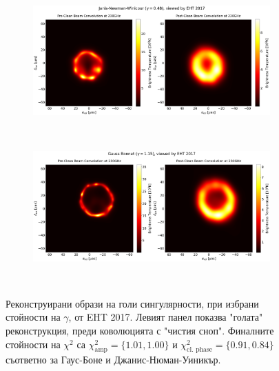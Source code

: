 \begin{figure}[h!]
	\centering
	\begin{subfigure}{12cm}
		\hspace{-1.5cm}
		\includegraphics[scale = 0.23]{Ehtim_plot_2017_no_blur_JNW.png}
	\end{subfigure}\\
	\begin{subfigure}{12cm}
		\hspace{-1.5cm}
		\includegraphics[scale = 0.23]{Ehtim_plot_2017_no_blur_GB.png}
	\end{subfigure}\\
	\label{Naked_Singularity_EHT_2017}
	\caption[Реконструирани образи на голи сингулярности, при избрани стойности на $\gamma$, от EHT 2017]{\small Реконструирани образи на голи сингулярности, при избрани стойности на $\gamma$, от EHT 2017. Левият панел показва "голата"$\,$ реконструкция, преди коволюцията с "чистия сноп". Финалните стойности на $\chi^2$ са $\chi^2_\text{amp} = \{1.01, 1.00\}$ и $\chi^2_\text{cl. phase} = \{0.91, 0.84\}$ съответно за Гаус-Боне и Джанис-Нюман-Уиникър.} 
\end{figure}

